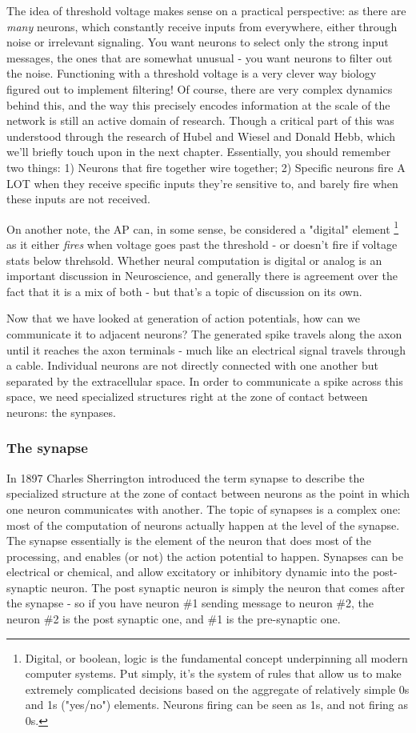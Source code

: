 The idea of threshold voltage makes sense on a practical perspective: as there are \textit{many} neurons, which constantly receive inputs from everywhere, either through noise or irrelevant signaling. You want neurons to select only the strong input messages, the ones that are somewhat unusual - you want neurons to filter out the noise. Functioning with a threshold voltage is a very clever way biology figured out to implement filtering! Of course, there are very complex dynamics behind this, and the way this precisely encodes information at the scale of the network is still an active domain of research. Though a critical part of this was understood through the research of Hubel and Wiesel and Donald  Hebb, which we'll briefly touch upon in the next chapter. Essentially, you should remember two things: 1) Neurons that fire together wire together; 2) Specific neurons fire A LOT when they receive specific inputs they're sensitive to, and barely fire when these inputs are not received.

On another note, the AP can, in some sense, be considered a "digital" element \footnote{Digital, or boolean, logic is the fundamental concept underpinning all modern computer systems. Put simply, it's the system of rules that allow us to make extremely complicated decisions based on the aggregate of relatively simple 0s and 1s ("yes/no") elements. Neurons firing can be seen as 1s, and not firing as 0s.} as it either \textit{fires} when voltage goes past the threshold - or doesn't fire if voltage stats below threhsold. Whether neural computation is digital or analog is an important discussion in Neuroscience, and generally there is agreement over the fact that it is a mix of both - but that's a topic of discussion on its own. 

Now that we have looked at generation of action potentials, how can we communicate it to adjacent neurons? The generated spike travels along the axon until it reaches the axon terminals - much like an electrical signal travels through a cable. Individual neurons are not directly connected with one another but separated by the extracellular space. In order to communicate a spike across this space, we need specialized structures right at the zone of contact between neurons: the synpases. 

\subsubsection{The synapse}

In 1897 Charles Sherrington introduced the term synapse to describe the specialized structure at
the zone of contact between neurons as the point in which one neuron communicates with another.
The topic of synapses is a complex one: most of the computation of neurons actually happen at the level of the synapse. The synapse essentially is the element of the neuron that does most of the processing, and enables (or not) the action potential to happen. Synapses can be electrical or chemical, and allow excitatory or inhibitory dynamic into the post-synaptic neuron. The post synaptic neuron is simply the neuron that comes after the synapse - so if you have neuron \#1 sending message to neuron \#2, the neuron \#2 is the post synaptic one, and \#1 is the pre-synaptic one.   

